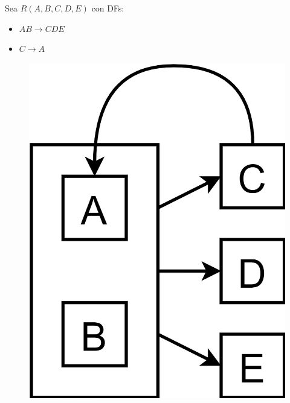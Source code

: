 \documentclass{templateNote}
\begin{document}
\begin{itemize}
\begin{enumerate}
        \begin{minipage}{0.4\textwidth}
            \begin{center}
                Sea $R(A,B,C,D,E)$ con DFs:
                \begin{itemize}
                    \item $AB \rightarrow CDE$
                    \item $C \rightarrow A$
                \end{itemize}
                \begin{figure}[H]
                    \centering
                    \colorbox{red!20!white}{\includegraphics[scale=0.08]{img/NOFNBC.png}}
                \end{figure}


\end{center}
\end{minipage}
\end{enumerate}
\end{itemize}
\end{document}
